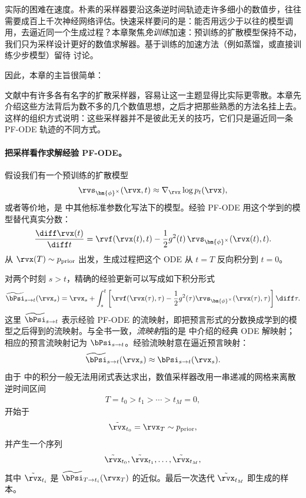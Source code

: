 实际的困难在速度。朴素的采样器要沿这条逆时间轨迹走许多细小的数值步，往往需要成百上千次神经网络评估。快速采样要问的是：能否用远少于以往的模型调用，去逼近同一个生成过程？本章聚焦\emph{免训练}加速：预训练的扩散模型保持不动，我们只为采样设计更好的数值求解器。基于训练的加速方法（例如蒸馏，或直接训练少步模型）留待  讨论。

因此，本章的主旨很简单：

文献中有许多各有名字的扩散采样器，容易让这一主题显得比实际更零散。本章先介绍这些方法背后为数不多的几个数值思想，之后才把那些熟悉的方法名挂上去。这样的组织方式说明：这些采样器并不是彼此无关的技巧，它们只是逼近同一条 PF-ODE 轨迹的不同方式。

\paragraph{把采样看作求解经验 PF-ODE。}
假设我们有一个预训练的扩散模型
\[
    \rvs_{\bm{\phi}^\times}(\rvx,t)
    \approx
    \nabla_{\rvx}\log p_t(\rvx),
\]
或者等价地，是  中其他标准参数化写法下的模型。经验 PF-ODE 用这个学到的模型替代真实分数：
\[
    \frac{\diff \rvx(t)}{\diff t}
    =
    \rvf(\rvx(t),t)
    -
    \frac{1}{2}g^2(t)\,
    \rvs_{\bm{\phi}^\times}(\rvx(t),t).
\]
从 $\rvx(T)\sim p_{\mathrm{prior}}$ 出发，生成过程把这个 ODE 从 $t=T$ 反向积分到 $t=0$。

对两个时刻 $s>t$，精确的经验更新可以写成如下积分形式
\begin{align}
\label{eq:solution-int-score}
\begin{aligned}
    \widetilde\bPsi_{s\to t}(\rvx_s)
    =
    \rvx_s
    +
    \int_s^t
    \left[
        \rvf(\rvx(\tau),\tau)
        -
        \frac{1}{2}g^2(\tau)
        \rvs_{\bm{\phi}^\times}(\rvx(\tau),\tau)
    \right]\diff \tau .
\end{aligned}
\end{align}
这里 $\widetilde{\bPsi}_{s\to t}$ 表示经验 PF-ODE 的流映射，即把预言形式的分数换成学到的模型之后得到的流映射。与全书一致，\emph{流映射}指的是  中介绍的经典 ODE 解映射；相应的预言流映射记为 $\bPsi_{s\to t}$。经验流映射意在逼近预言映射：
\[
    \widetilde{\bPsi}_{s\to t}(\rvx_s)
    \approx
    \bPsi_{s\to t}(\rvx_s).
\]
由于  中的积分一般无法用闭式表达求出，数值采样器改用一串递减的网格来离散逆时间区间
\begin{align}
\label{eq:time-step-def}
    T=t_0>t_1>\cdots>t_M=0,
\end{align}
开始于
\[
    \tilde{\rvx}_{t_0}=\rvx_T\sim p_{\mathrm{prior}},
\]
并产生一个序列
\[
    \tilde{\rvx}_{t_0},\tilde{\rvx}_{t_1},\ldots,\tilde{\rvx}_{t_M},
\]
其中 $\tilde{\rvx}_{t_i}$ 是 $\widetilde\bPsi_{T\to t_i}(\rvx_T)$ 的近似。最后一次迭代 $\tilde{\rvx}_{t_M}$ 即生成的样本。

